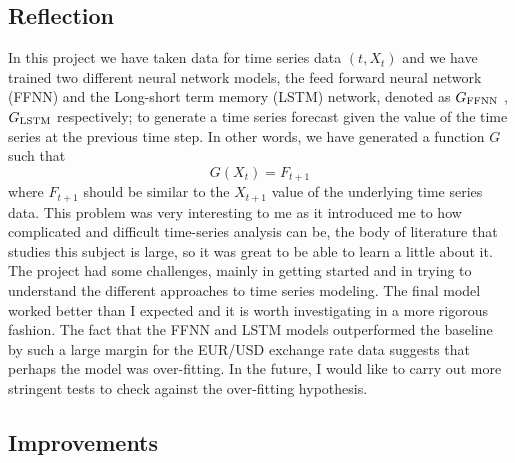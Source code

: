 \documentclass[10pt,a4paper]{article}
\begin{document}
\subsection{Reflection}
%
In this project we have taken data for time series data $(t,X_t)$ and we have trained two different neural network models, the feed forward neural network (FFNN) and the Long-short term memory (LSTM) network, denoted as $G_{\rm FFNN}$ ,$G_{\rm LSTM}$ respectively; to generate a time series forecast given the value of the time series at the previous time step. In other words, we have generated a function $G$ such that
\begin{equation}
G(X_{t}) = F_{t+1}
\end{equation}
where $F_{t+1}$ should be similar to the $X_{t+1}$ value of the underlying time series data. This problem was very interesting to me as it introduced me to how complicated and difficult time-series analysis can be, the body of literature that studies this subject is large, so it was great to be able to learn a little about it. The project had some challenges, mainly in getting started and in trying to understand the different approaches to time series modeling. The final model worked better than I expected and it is worth investigating in a more rigorous fashion. The fact that the FFNN and LSTM models outperformed the baseline by such a large margin for the EUR/USD exchange rate data suggests that perhaps the model was over-fitting. In the future, I would like to carry out more stringent tests to check against the over-fitting hypothesis.
 

\subsection{Improvements}
%
\end{document}
